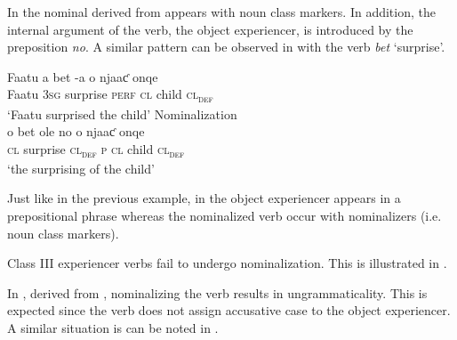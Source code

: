 \documentclass[output=paper]{langscibook}
\begin{document}
In  the  nominal derived from  appears with noun class markers. In addition, the internal argument of the verb, the object experiencer, is introduced by the preposition \textit{no}.  A similar pattern can be observed in  with the verb \textit{bet} `surprise'.

\ea \label{ex:tamba:15}
\ea \label{ex:tamba:15a}
\gll Faatu a      bet    {}-a        o        njaaƈ onqe\\
Faatu \textsc{3sg}  surprise \textsc{perf}   \textsc{cl}     child   \textsc{cl\textsubscript{def}} \\
\glt `Faatu surprised the child'
\ex Nominalization\\ \label{ex:tamba:15b}
\gll o     bet        ole      no o    njaaƈ   onqe\\
\textsc{cl}   surprise  \textsc{cl\textsubscript{def}}   \textsc{p}  \textsc{cl}  child     \textsc{cl\textsubscript{def}}\\
\glt `the surprising of the child'
\z
\z

Just like in the previous example, in  the object experiencer appears in a prepositional phrase whereas the nominalized verb occur with nominalizers (i.e. noun class markers). 

 Class III experiencer verbs fail to undergo nominalization. This  is illustrated in .


\ea \label{ex:tamba:16}
\label{ex:tamba:16a}
\label{ex:tamba:16b}
\z
\z
 
In , derived from , nominalizing the verb results in ungrammaticality. This is expected since the verb does not assign accusative case to the object experiencer. A similar situation is can be noted in .

\ea \label{ex:tamba:17}
\label{ex:tamba:17a}
\label{ex:tamba:17b}
\z
\z
\end{document}
